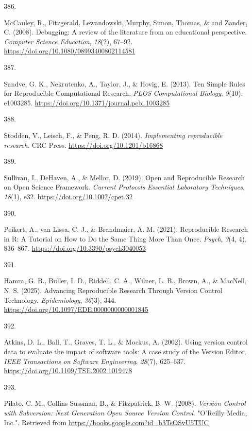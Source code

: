 \documentclass[
  11pt,
  letterpaper,
]{scrreprt}
\newlength{\cslhangindent}
\newlength{\csllabelwidth}
\newenvironment{CSLReferences}[2] %
 {\begin{list}{}{%
  \setlength{\itemindent}{0pt}
  \setlength{\leftmargin}{0pt}
  \setlength{\parsep}{0pt}
  \ifodd #1
   \setlength{\leftmargin}{\cslhangindent}
   \setlength{\itemindent}{-1\cslhangindent}
  \fi
  \setlength{\itemsep}{#2\baselineskip}}}
 {\end{list}}
\newcommand{\CSLLeftMargin}[1]{\parbox[t]{\csllabelwidth}{\strut#1\strut}}
\newcommand{\CSLRightInline}[1]{\parbox[t]{\linewidth - \csllabelwidth}{\strut#1\strut}}
\begin{document}
\begin{CSLReferences}{0}{0}
\CSLLeftMargin{386. }%
\CSLRightInline{McCauley, R., Fitzgerald, Lewandowski, Murphy, Simon,
Thomas, \& and Zander, C. (2008). Debugging: A review of the literature
from an educational perspective. \emph{Computer Science Education},
\emph{18}(2), 67--92. \url{https://doi.org/10.1080/08993400802114581}}

\CSLLeftMargin{387. }%
\CSLRightInline{Sandve, G. K., Nekrutenko, A., Taylor, J., \& Hovig, E.
(2013). Ten {Simple Rules} for {Reproducible Computational Research}.
\emph{PLOS Computational Biology}, \emph{9}(10), e1003285.
\url{https://doi.org/10.1371/journal.pcbi.1003285}}

\CSLLeftMargin{388. }%
\CSLRightInline{Stodden, V., Leisch, F., \& Peng, R. D. (2014).
\emph{Implementing reproducible research}. CRC Press.
\url{https://doi.org/10.1201/b16868}}

\CSLLeftMargin{389. }%
\CSLRightInline{Sullivan, I., DeHaven, A., \& Mellor, D. (2019). Open
and {Reproducible Research} on {Open Science Framework}. \emph{Current
Protocols Essential Laboratory Techniques}, \emph{18}(1), e32.
\url{https://doi.org/10.1002/cpet.32}}

\CSLLeftMargin{390. }%
\CSLRightInline{Peikert, A., van Lissa, C. J., \& Brandmaier, A. M.
(2021). Reproducible {Research} in {R}: {A Tutorial} on {How} to {Do}
the {Same Thing More Than Once}. \emph{Psych}, \emph{3}(4, 4), 836--867.
\url{https://doi.org/10.3390/psych3040053}}

\CSLLeftMargin{391. }%
\CSLRightInline{Hamra, G. B., Buller, I. D., Riddell, C. A., Wilner, L.
B., Brown, A., \& MacNell, N. S. (2025). Advancing {Reproducible
Research Through Version Control Technology}. \emph{Epidemiology},
\emph{36}(3), 344. \url{https://doi.org/10.1097/EDE.0000000000001845}}

\CSLLeftMargin{392. }%
\CSLRightInline{Atkins, D. L., Ball, T., Graves, T. L., \& Mockus, A.
(2002). Using version control data to evaluate the impact of software
tools: A case study of the {Version Editor}. \emph{IEEE Transactions on
Software Engineering}, \emph{28}(7), 625--637.
\url{https://doi.org/10.1109/TSE.2002.1019478}}

\CSLLeftMargin{393. }%
\CSLRightInline{Pilato, C. M., Collins-Sussman, B., \& Fitzpatrick, B.
W. (2008). \emph{Version {Control} with {Subversion}: {Next Generation
Open Source Version Control}}. "O'Reilly Media, Inc.". Retrieved from
\url{https://books.google.com?id=b3TsOSvU5TUC}}


\end{CSLReferences}
\end{document}
